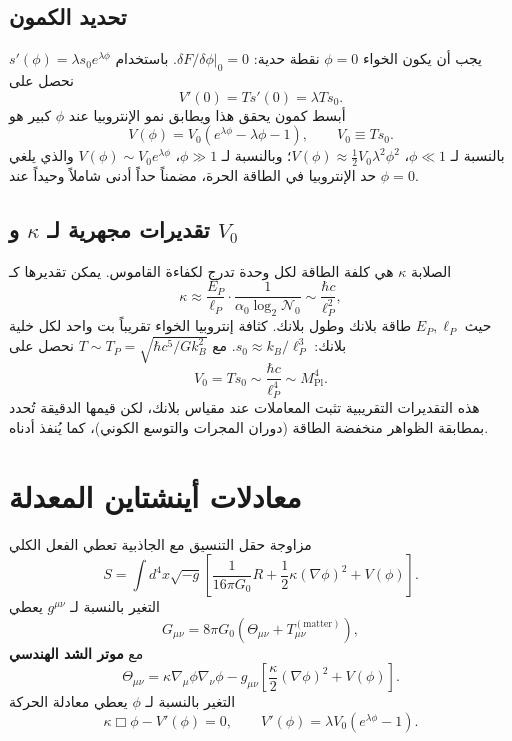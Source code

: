 \documentclass[12pt,a4paper]{article}
\begin{document}
	\subsection{تحديد الكمون}
	يجب أن يكون الخواء \(\phi=0\) نقطة حدية: \(\delta F/\delta\phi|_0 = 0\). باستخدام \(s'(\phi) = \lambda s_0 e^{\lambda\phi}\) نحصل على
	\[
	V'(0) = T s'(0) = \lambda T s_0.
	\]
	أبسط كمون يحقق هذا ويطابق نمو الإنتروبيا عند \(\phi\) كبير هو
	\begin{equation}
		\boxed{V(\phi) = V_0 \left( e^{\lambda\phi} - \lambda\phi - 1 \right), \qquad V_0 \equiv T s_0.}
		\label{eq:V}
	\end{equation}
	بالنسبة لـ \(\phi \ll 1\)، \(V(\phi) \approx \frac12 V_0 \lambda^2 \phi^2\)؛ وبالنسبة لـ \(\phi \gg 1\)، \(V(\phi) \sim V_0 e^{\lambda\phi}\) والذي يلغي حد الإنتروبيا في الطاقة الحرة، مضمناً حداً أدنى شاملاً وحيداً عند \(\phi=0\).
	
	\subsection{تقديرات مجهرية لـ \(\kappa\) و \(V_0\)}
	الصلابة \(\kappa\) هي كلفة الطاقة لكل وحدة تدرج لكفاءة القاموس. يمكن تقديرها كـ
	\[
	\kappa \approx \frac{E_P}{\ell_P} \cdot \frac{1}{\alpha_0 \log_2 \mathcal{N}_0} \sim \frac{\hbar c}{\ell_P^2},
	\]
	حيث \(E_P, \ell_P\) طاقة بلانك وطول بلانك. كثافة إنتروبيا الخواء تقريباً بت واحد لكل خلية بلانك: \(s_0 \approx k_B / \ell_P^3\). مع \(T \sim T_P = \sqrt{\hbar c^5 / G k_B^2}\) نحصل على
	\[
	V_0 = T s_0 \sim \frac{\hbar c}{\ell_P^4} \sim M_{\mathrm{Pl}}^4.
	\]
	هذه التقديرات التقريبية تثبت المعاملات عند مقياس بلانك، لكن قيمها الدقيقة تُحدد بمطابقة الظواهر منخفضة الطاقة (دوران المجرات والتوسع الكوني)، كما يُنفذ أدناه.
	
	\section{معادلات أينشتاين المعدلة}
	مزاوجة حقل التنسيق مع الجاذبية تعطي الفعل الكلي
	\begin{equation}
		S = \int d^4x \sqrt{-g} \left[ \frac{1}{16\pi G_0} R + \frac{1}{2}\kappa (\nabla\phi)^2 + V(\phi) \right].
		\label{eq:action}
	\end{equation}
	التغير بالنسبة لـ \(g^{\mu\nu}\) يعطي
	\begin{equation}
		G_{\mu\nu} = 8\pi G_0 \left( \Theta_{\mu\nu} + T_{\mu\nu}^{(\mathrm{matter})} \right),
		\label{eq:einstein}
	\end{equation}
	مع \textbf{موتر الشد الهندسي}
	\begin{equation}
		\Theta_{\mu\nu} = \kappa \nabla_\mu \phi \nabla_\nu \phi - g_{\mu\nu} \left[ \frac{\kappa}{2} (\nabla\phi)^2 + V(\phi) \right].
		\label{eq:Theta}
	\end{equation}
	التغير بالنسبة لـ \(\phi\) يعطي معادلة الحركة
	\begin{equation}
		\kappa \Box \phi - V'(\phi) = 0, \qquad V'(\phi) = \lambda V_0 \left( e^{\lambda\phi} - 1 \right).
		\label{eq:phieom}
	\end{equation}
	
\end{document}
